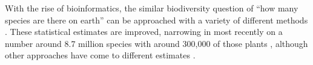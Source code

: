 \documentclass[12pt]{article}
\begin{document}
With the rise of bioinformatics, the similar biodiversity question of
``how many species are there on earth'' can be approached with a variety of different methods
\citep{may1988many,erwin1991many, stork1993many, joppa2010,
  costello2011, mora2011plos}.  These statistical estimates are
improved, narrowing in most recently on a number around 8.7 million
species with around 300,000 of those plants \citep{mora2011plos}, although other approaches have come to different estimates \citep{costello2011}.
% 
%
%
% 
% 
\end{document}

